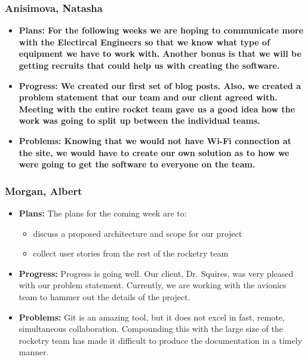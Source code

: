 \documentclass[10pt,draftclsnofoot,onecolumn]{IEEEtran}
\begin{document}
\subsubsection{Anisimova, Natasha}
\begin{itemize}
	\item \textbf{Plans: For the following weeks we are hoping to communicate more with the Electircal Engineers so that
		we know what type of equipment we have to work with. Another bonus is that we will be getting recruits that could
		help us with creating the software.}
	\item \textbf{Progress: We created our first set of blog posts. Also, we created a problem statement that our team
		and our client agreed with. Meeting with the entire rocket team gave us a good idea how the work was going to split up
		between the individual teams. }
	\item \textbf{Problems: Knowing that we would not have Wi-Fi connection at the site, we would have to create our own
		solution as to how we were going to get the software to everyone on the team.}
\end{itemize}
\subsubsection{Morgan, Albert}
\begin{itemize}
	\item \textbf{Plans: }
	The plans for the coming week are to:
	\begin{itemize}
		\item discuss a proposed architecture and scope for our project
		\item collect user stories from the rest of the rocketry team
	\end{itemize}
	\item \textbf{Progress: }
	Progress is going well. Our client, Dr. Squires, was very pleased with our problem statement. Currently, we are working with the avionics team to hammer out the details of the project.
	\item \textbf{Problems: }
	Git is an amazing tool, but it does not excel in fast, remote, simultaneous collaboration. Compounding this with the large size of the rocketry team has made it difficult to produce the documentation in a timely manner.
\end{itemize}
\end{document}
